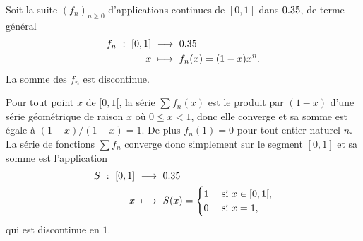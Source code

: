 \begin{prop}{}
    Soit la suite $(f_n)_{n \geqslant 0}$ d'applications continues de $[0,1]$ dans $0.35$, de terme général
    \begin{alignat*}{2}
        f_n\ :\ [0,1]\ &\longrightarrow\ 0.35\\
        x\ &\longmapsto\ f_n(x) = (1-x)x^n.
    \end{alignat*}
    La somme des $f_n$ est discontinue.
\end{prop}

\begin{preuve}
    Pour tout point $x$ de $[0,1[$, la série $\sum f_n(x)$ est le produit par $(1-x)$ d'une série géométrique de raison $x$ où $0 \leqslant x < 1$, donc elle converge et sa somme est égale à $(1-x)/(1-x) = 1$. De plus $f_n(1) = 0$ pour tout entier naturel $n$. La série de fonctions $\sum f_n$ converge donc simplement sur le segment $[0,1]$ et sa somme est l'application 
    \begin{alignat*}{2}
        S\ :\ [0,1]\ &\longrightarrow\ 0.35\\
        x\ &\longmapsto\ S(x) =
        \begin{cases}
            1 &\text{ si } x \in [0,1[,\\
            0 &\text{ si } x = 1,
        \end{cases}
    \end{alignat*}
    qui est discontinue en $1$.
\end{preuve}
